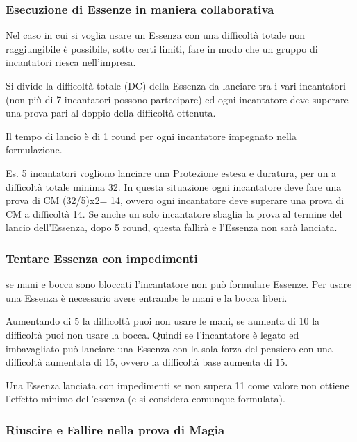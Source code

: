 \documentclass[a4paper,10 pt,twoside,openany]{book}
\begin{document}
\subsubsection{Esecuzione di Essenze in maniera collaborativa}

Nel caso in cui si voglia usare un Essenza con una difficoltà totale non raggiungibile è possibile, sotto certi limiti, fare in modo che un gruppo di incantatori riesca nell'impresa.

Si divide la difficoltà totale (DC) della Essenza da lanciare tra i vari incantatori (non più di 7 incantatori possono partecipare) ed ogni incantatore deve superare una prova pari al doppio della difficoltà ottenuta.

Il tempo di lancio è di 1 round per ogni incantatore impegnato nella formulazione.

Es. 5 incantatori vogliono lanciare una Protezione estesa e duratura, per un a difficoltà totale minima 32. In questa situazione ogni incantatore deve fare una prova di CM (32/5)x2= 14, ovvero ogni incantatore deve superare una prova di CM a difficoltà 14. Se anche un solo incantatore sbaglia la prova al termine del lancio dell'Essenza, dopo 5 round, questa fallirà e l'Essenza non sarà lanciata.

\subsubsection{Tentare Essenza con impedimenti}

se mani e bocca sono bloccati l'incantatore non può formulare Essenze. Per usare una Essenza è necessario avere entrambe le mani e la bocca liberi.

Aumentando di 5 la difficoltà puoi non usare le mani, se aumenta di 10 la difficoltà puoi non usare la bocca. Quindi se l'incantatore è legato ed imbavagliato può lanciare una Essenza con la sola forza del pensiero con una difficoltà aumentata di 15, ovvero la difficoltà base aumenta di 15.

Una Essenza lanciata con impedimenti se non supera 11 come valore non ottiene l'effetto minimo dell'essenza (e si considera comunque formulata).

\subsubsection{Riuscire e Fallire nella prova di Magia}
\end{document}
